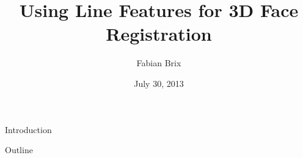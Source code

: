 \documentclass{beamer}
\title[Bachelor Thesis]{Using Line Features for 3D Face Registration}
\author{Fabian Brix}
\date{July 30, 2013}
\begin{document}
\begin{frame}
\titlepage
\end{frame}

\begin{frame}{Introduction}
\end{frame}

\begin{frame}{Outline}
\end{frame}
\end{document}
